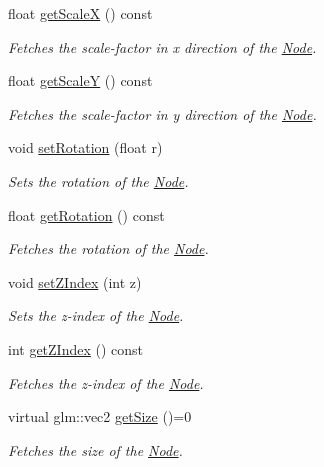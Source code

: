\begin{DoxyCompactItemize}
float \mbox{\hyperlink{classsage_1_1Node_a27040ef8ab59ccf42b87d6ddc8d794e6}{get\+ScaleX}} () const
\begin{DoxyCompactList}\small\item\em Fetches the scale-\/factor in x direction of the \mbox{\hyperlink{classsage_1_1Node}{Node}}. \end{DoxyCompactList}\item 
float \mbox{\hyperlink{classsage_1_1Node_ab87661ab8940512baf2e7639ea55ff87}{get\+ScaleY}} () const
\begin{DoxyCompactList}\small\item\em Fetches the scale-\/factor in y direction of the \mbox{\hyperlink{classsage_1_1Node}{Node}}. \end{DoxyCompactList}\item 
void \mbox{\hyperlink{classsage_1_1Node_a422e877f5a830ad4d50b8e13250ee553}{set\+Rotation}} (float r)
\begin{DoxyCompactList}\small\item\em Sets the rotation of the \mbox{\hyperlink{classsage_1_1Node}{Node}}. \end{DoxyCompactList}\item 
float \mbox{\hyperlink{classsage_1_1Node_aca7139bc3ea6705d41bb65a4fb7ddb6c}{get\+Rotation}} () const
\begin{DoxyCompactList}\small\item\em Fetches the rotation of the \mbox{\hyperlink{classsage_1_1Node}{Node}}. \end{DoxyCompactList}\item 
void \mbox{\hyperlink{classsage_1_1Node_a16a5cb054eb05a3d22e97b6d690ebc3f}{set\+Z\+Index}} (int z)
\begin{DoxyCompactList}\small\item\em Sets the z-\/index of the \mbox{\hyperlink{classsage_1_1Node}{Node}}. \end{DoxyCompactList}\item 
int \mbox{\hyperlink{classsage_1_1Node_a8e9bb673c18c8637fb2bba6a0e2a8653}{get\+Z\+Index}} () const
\begin{DoxyCompactList}\small\item\em Fetches the z-\/index of the \mbox{\hyperlink{classsage_1_1Node}{Node}}. \end{DoxyCompactList}\item 
virtual glm\+::vec2 \mbox{\hyperlink{classsage_1_1Node_a286d3b5b0d16d31991b58cab972fb03b}{get\+Size}} ()=0
\begin{DoxyCompactList}\small\item\em Fetches the size of the \mbox{\hyperlink{classsage_1_1Node}{Node}}. \end{DoxyCompactList}\item 

\end{DoxyCompactItemize}
